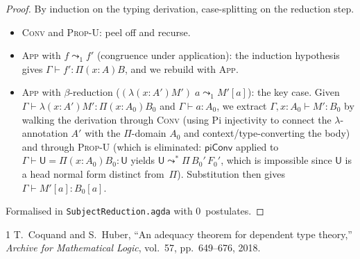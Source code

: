 \documentclass[11pt]{article}
\newcommand{\hastype}[3]{#1 \vdash #2 : #3}
\newcommand{\conveq}[4]{#1 \vdash #2 = #3 : #4}
\newcommand{\Pitype}[2]{\Pi(#1)#2}
\newcommand{\Lamterm}[2]{\lambda(#1)#2}
\newcommand{\App}[2]{#1\;#2}
\newcommand{\U}{\mathsf{U}}
\newcommand{\Red}{\mathrel{\leadsto^*}}
\begin{document}
\begin{proof}
  By induction on the typing derivation, case-splitting on the
  reduction step.
  \begin{itemize}
    \item \textsc{Conv} and \textsc{Prop-U}: peel off and recurse.
    \item \textsc{App} with $f \leadsto_1 f'$ (congruence under
      application): the induction hypothesis gives
      $\hastype{\Gamma}{f'}{\Pitype{x{:}A}{B}}$, and we rebuild
      with \textsc{App}.
    \item \textsc{App} with $\beta$-reduction
      ($\App{(\Lamterm{x{:}A'}{M'})}{a} \leadsto_1 M'[a]$):
      the key case.  Given
      $\hastype{\Gamma}{\Lamterm{x{:}A'}{M'}}{\Pitype{x{:}A_0}{B_0}}$
      and $\hastype{\Gamma}{a}{A_0}$, we extract
      $\hastype{\Gamma, x{:}A_0}{M'}{B_0}$ by walking the derivation
      through \textsc{Conv} (using Pi injectivity to connect the
      $\lambda$-annotation $A'$ with the $\Pi$-domain $A_0$ and
      context/type-converting the body) and through \textsc{Prop-U}
      (which is eliminated: $\mathsf{piConv}$ applied to
      $\conveq{\Gamma}{\U}{\Pitype{x{:}A_0}{B_0}}{\U}$ yields
      $\U \Red \Pi\,B_0'\,F_0'$, which is impossible since $\U$
      is a head normal form distinct from~$\Pi$).
      Substitution then gives
      $\hastype{\Gamma}{M'[a]}{B_0[a]}$.
  \end{itemize}
  Formalised in \texttt{SubjectReduction.agda} with 0~postulates.
\end{proof}

\begin{thebibliography}{1}
  T.~Coquand and S.~Huber,
  ``An adequacy theorem for dependent type theory,''
  \emph{Archive for Mathematical Logic}, vol.~57, pp.~649--676, 2018.
\end{thebibliography}
\end{document}

